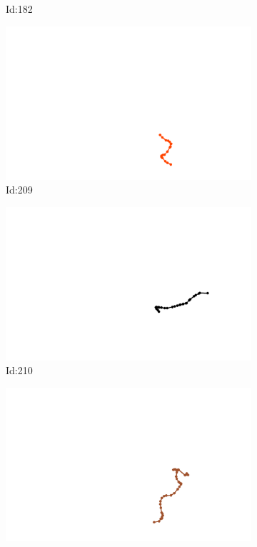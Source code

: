 \documentclass[12pt,twoside]{report}
\begin{document}
\begin{figure}
\begin{subfigure}[b]{0.20\textwidth}
\caption{Id:182}
\end{subfigure}
\begin{subfigure}[b]{0.20\textwidth}
\centering
\includegraphics[width=\textwidth]{../trajectories/209.png}
\caption{Id:209}
\end{subfigure}
\begin{subfigure}[b]{0.20\textwidth}
\centering
\includegraphics[width=\textwidth]{../trajectories/210.png}
\caption{Id:210}
\end{subfigure}
\begin{subfigure}[b]{0.20\textwidth}
\centering
\includegraphics[width=\textwidth]{../trajectories/212.png}

\end{subfigure}
\end{figure}
\end{document}
